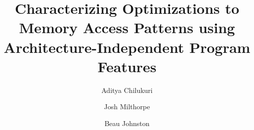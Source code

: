 \documentclass[review=false, sigchi]{acmart}
\title[Architecture-Independent Memory Access Pattern Analysis]{Characterizing Optimizations to Memory Access Patterns using Architecture-Independent Program Features}
\author{Aditya Chilukuri}
\affiliation{%
	\institution{Australian National University}}
\author{Josh Milthorpe}
\affiliation{%
	\institution{Australian National University}}
\author{Beau Johnston}
\affiliation{%
	\institution{Australian National University}}
\begin{document}
	

\end{document}

